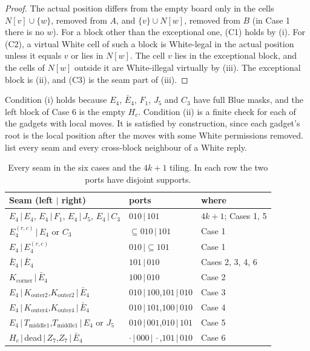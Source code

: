 \documentclass[11pt]{amsart}
\theoremstyle{definition}
\newcommand{\Nb}{N}
\newcommand{\Ebar}{\bar E_4}
\newcommand{\Kc}{K_{\mathrm{corner}}}
\newcommand{\Ktwo}{K_{\mathrm{outer2}}}
\newcommand{\Kfour}{K_{\mathrm{outer4}}}
\newcommand{\Tm}{T_{\mathrm{middle1}}}
\begin{document}
\begin{proof}
The actual position differs from the empty board only in the cells
$\Nb[v]\cup\{w\}$, removed from $A$, and $\{v\}\cup \Nb[w]$, removed from $B$
(in Case 1 there is no $w$). For a block other than the exceptional one, (C1)
holds by (i). For (C2), a virtual White cell of such a block is White-legal
in the actual position unless it equals $v$ or lies in $\Nb[w]$. The cell $v$
lies in the exceptional block, and the cells of $\Nb[w]$ outside it are
White-illegal virtually by (iii). The exceptional block is (ii), and (C3) is
the seam part of (iii).
\end{proof}

Condition (i) holds because $E_4$, $\Ebar$, $F_1$, $J_5$ and $C_3$ have full
Blue masks, and the left block of Case 6 is the empty $H_c$. Condition (ii)
is a finite check for each of the gadgets with local moves. It is satisfied by
construction, since each gadget's root is the local position after the moves
with some White permissions removed.  list every
seam and every cross-block neighbour of a White reply.

\begin{table}[ht]
\centering\small
\begin{tabular}{@{}l l l@{}}
\toprule
Seam (left $|$ right) & ports & where\\
\midrule
$E_4\,|\,E_4$, $E_4\,|\,F_1$, $E_4\,|\,J_5$, $E_4\,|\,C_3$ & $010\,|\,101$ & $4k+1$; Cases 1, 5\\
$E_4^{(r,c)}\,|\,E_4$ or $C_3$ & $\subseteq010\,|\,101$ & Case 1\\
$E_4\,|\,E_4^{(r,c)}$ & $010\,|\subseteq101$ & Case 1\\
$\Ebar\,|\,\Ebar$ & $101\,|\,010$ & Cases 2, 3, 4, 6\\
$\Kc\,|\,\Ebar$ & $100\,|\,010$ & Case 2\\
$E_4\,|\,\Ktwo$,\quad $\Ktwo\,|\,\Ebar$ & $010\,|\,100$,\quad $101\,|\,010$ & Case 3\\
$E_4\,|\,\Kfour$,\quad $\Kfour\,|\,\Ebar$ & $010\,|\,101$,\quad $100\,|\,010$ & Case 4\\
$E_4\,|\,\Tm$,\quad $\Tm\,|\,E_4$ or $J_5$ & $010\,|\,001$,\quad $010\,|\,101$ & Case 5\\
$H_c\,|\,$dead$\,|\,Z_7$,\quad $Z_7\,|\,\Ebar$ & $\cdot\,|\,000\,|\,\cdot$,\quad $101\,|\,010$ & Case 6\\
\bottomrule
\end{tabular}
\caption{Every seam in the six cases and the $4k+1$ tiling. In each row the
two ports have disjoint supports.}
\label{tab:seams}
\end{table}
\end{document}

